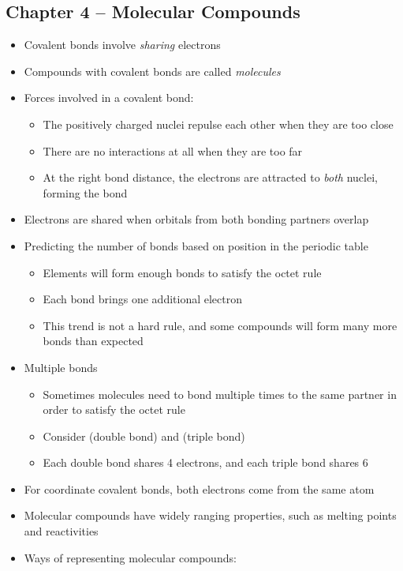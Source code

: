\documentclass[12pt, letterpaper]{memoir}
\begin{document}
	\subsection*{Chapter 4 -- Molecular Compounds}
	\begin{itemize}
		\item Covalent bonds involve \emph{sharing} electrons
		\item Compounds with covalent bonds are called \emph{molecules}
		\item Forces involved in a covalent bond:
		\begin{itemize}
			\item The positively charged nuclei repulse each other when they are too close
			\item There are no interactions at all when they are too far
			\item At the right bond distance, the electrons are attracted to \emph{both} nuclei, forming the bond
		\end{itemize}
		\item Electrons are shared when orbitals from both bonding partners overlap
		\item Predicting the number of bonds based on position in the periodic table
		\begin{itemize}
			\item Elements will form enough bonds to satisfy the octet rule
			\item Each bond brings one additional electron
			\item This trend is not a hard rule, and some compounds will form many more bonds than expected
		\end{itemize}
		\item Multiple bonds
		\begin{itemize}
			\item Sometimes molecules need to bond multiple times to the same partner in order to satisfy the octet rule
			\item Consider  (double bond) and  (triple bond)
			\item Each double bond shares 4 electrons, and each triple bond shares 6
		\end{itemize}
		\item For coordinate covalent bonds, both electrons come from the same atom
		\item Molecular compounds have widely ranging properties, such as melting points and reactivities
		\item Ways of representing molecular compounds:

\end{itemize}
\end{document}
